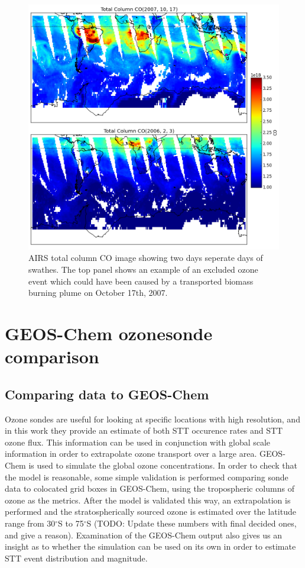     \begin{figure}[!htbp]
      \includegraphics[width=\textwidth]{Figures/Ozone/AIRS_compare.png}
      \caption{AIRS total column CO image showing two days seperate days of swathes. The top panel shows an example of an excluded ozone event which could have been caused by a transported biomass burning plume on October 17th, 2007.}
      \label{ch_o3:fig:excludedeg}
    \end{figure}

  
\section{GEOS-Chem ozonesonde comparison}
  \subsection{Comparing data to GEOS-Chem}
    
    Ozone sondes are useful for looking at specific locations with high resolution, and in this work they provide an estimate of both STT occurence rates and STT ozone flux.
    This information can be used in conjunction with global scale information in order to extrapolate ozone transport over a large area.
    GEOS-Chem is used to simulate the global ozone concentrations.
    In order to check that the model is reasonable, some simple validation is performed comparing sonde data to colocated grid boxes in GEOS-Chem, using the tropospheric columns of ozone as the metrics.
    After the model is validated this way, an extrapolation is performed and the stratospherically sourced ozone is estimated over the latitude range from 30$^{\circ}$S to 75$^{\circ}$S (TODO: Update these numbers with final decided ones, and give a reason).
    Examination of the GEOS-Chem output also gives us an insight as to whether the simulation can be used on its own in order to estimate STT event distribution and magnitude.
    
